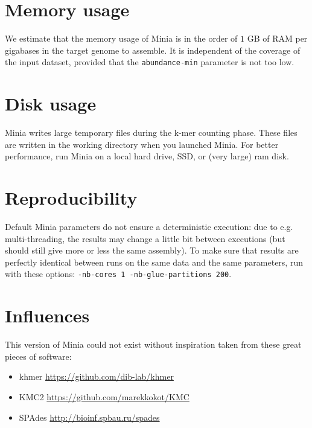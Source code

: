 \documentclass[a4paper]{article}
\begin{document}
\section{Memory usage}

We estimate that the memory usage of Minia is in the order of $1$ GB of RAM per gigabases in the target genome to assemble. It is independent of the coverage of the input dataset, provided that the \verb!abundance-min! parameter is not too low.

\section{Disk usage}

Minia writes large temporary files during the k-mer counting phase. These files are written in the working directory when you launched Minia. For better performance, run Minia on a local hard drive, SSD, or (very large) ram disk.

\section{Reproducibility}

Default Minia parameters do not ensure a deterministic execution: due to e.g. multi-threading, the results may change a little bit between executions (but should still give more or less the same assembly).
To make sure that results are perfectly identical between runs on the same data and the same parameters, run with these options:
\verb!-nb-cores 1 -nb-glue-partitions 200!.

\section{Influences}

This version of Minia could not exist without inspiration taken from these great pieces of software:
\begin{itemize}
    \item khmer \url{https://github.com/dib-lab/khmer}
    \item KMC2 \url{https://github.com/marekkokot/KMC}
    \item SPAdes \url{http://bioinf.spbau.ru/spades}
\end{itemize}
\end{document}
